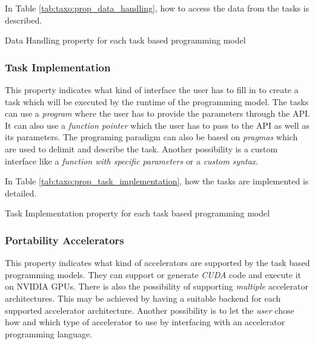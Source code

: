 In Table \ref{tab:taxo:prop_data_handling}, how to access the data from the tasks is described.
\begin{table}[H]
	\caption{Data Handling property for each task based programming model \label{tab:taxo:prop_data_handling}}
	\centering
	\begin{multicols}{2}
		

		
	\end{multicols}
\end{table}

\subsubsection{Task Implementation}
This property indicates what kind of interface the user has to fill in to create a task which will be executed by the runtime of the programming model.
The tasks can use a \textit{program} where the user has to provide the parameters through the API.
It can also use a \textit{function pointer} which the user has to pass to the API as well as its parameters.
The programing paradigm can also be based on \textit{pragmas} which are used to delimit and describe the task.
Another possibility is a custom interface like a \textit{function with specific parameters} or a \textit{custom syntax}.

In Table \ref{tab:taxo:prop_task_implementation}, how the tasks are implemented is detailed.
\begin{table}[H]
	\caption{Task Implementation property for each task based programming model \label{tab:taxo:prop_task_implementation}}
	\centering
	\begin{multicols}{2}
		

		
	\end{multicols}
\end{table}

\subsubsection{Portability Accelerators}
This property indicates what kind of accelerators are supported by the task based programming models.
They can support or generate \textit{CUDA} code and execute it on NVIDIA GPUs.
There is also the possibility of supporting \textit{multiple} accelerator architectures.
This may be achieved by having a suitable backend for each supported accelerator architecture.
Another possibility is to let the \textit{user} chose how and which type of accelerator to use by interfacing with an accelerator programming language.


